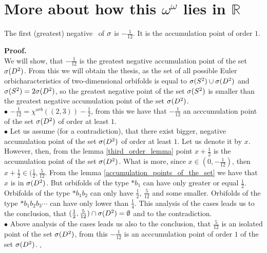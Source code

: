 \section{More about how this $\omega^\omega$ lies in $\mathbb{R}$}
\begin{observation}
The first (greatest) negative \apots\ of ${\sigma}$ is 
$-\frac{1}{12}$. It is the accumulation point of order $1$. 
\end{observation}
\noindent\textbf{Proof.} \\
We will show, that $-\frac{1}{12}$ is the greatest negative accumulation point of the set ${{\sigma}(D^2)}$. 
From this we will obtain the thesis, as the set of all possible Euler orbicharacteristics 
of two-dimensional orbifolds is equal to ${{\sigma}(S^2)} \cup {{\sigma}(D^2)}$ and ${{\sigma}(S^2)} = 2{{\sigma}(D^2)}$, so 
the greatest negative point of the set ${{\sigma}(S^2)}$ is smaller than the greatest negative accumulation 
point of the set ${{\sigma}(D^2)}$. \\
$\bullet$ $-\frac{1}{12}=\chi^{orb}((2,3))-\frac{1}{2}$, from this we have that $-\frac{1}{12}$ 
an acccumulation point of the set ${{\sigma}(D^2)}$ of order at least $1$. \\
$\bullet$ Let us assume (for a contradiction), that there exist bigger, negative 
accumulation point of the set ${{\sigma}(D^2)}$ of order at least $1$. Let us denote it by $x$. \\
However, then, from the lemma \ref{third_order_lemma} point $x+\frac{1}{2}$ is the accumulation 
point of the set ${{\sigma}(D^2)}$. What is more, since $x\in (0, -\frac{1}{12})$, then $x+\frac{1}{2} 
\in (\frac{1}{2}, \frac{5}{12}$. From the lemma \ref{accumulation_points_of_the_set} we 
have that $x$ is in ${{\sigma}(D^2)}$. But orbifolds of the type $\ast b_1$ can have \Eoc only greater or 
equal $\frac{1}{2}$. Orbifolds of the type $\ast b_1b_2$ can only have \Eoc $\frac{1}{2}$, 
$\frac{5}{12}$ and some smaller. Orbifolds of the type $\ast b_1b_2b_3\cdots$ can have \Eoc only 
lower than $\frac{1}{4}$. This analysis of the cases leads us to the conclusion, that 
$(\frac{1}{2},\frac{5}{12})\cap {{\sigma}(D^2)}=\emptyset$ and to the contradiction. \\
$\bullet$ Above analysis of the cases leads us also to the conclusion, that $\frac{5}{12}$ 
is 
an isolated point of the set ${{\sigma}(D^2)}$, from this $-\frac{1}{12}$ is an acccumulation point 
of order $1$ of the set ${{\sigma}(D^2)}$. $_\square$ \\ 
 








